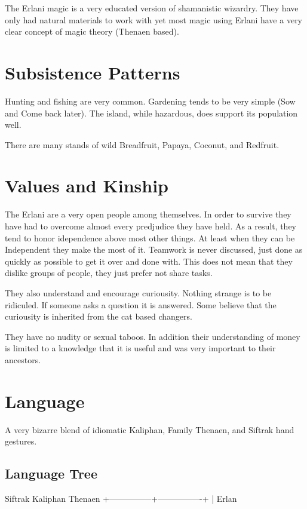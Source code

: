 The Erlani magic is a very educated version of shamanistic wizardry. They
have only had natural materials to work with yet most magic using Erlani
have a very clear concept of magic theory (Thenaen based).

\section{Subsistence Patterns}

Hunting and fishing are very common. Gardening tends to be very
simple (Sow and Come back later). The island, while hazardous, does
support its population well.

There are many stands of wild Breadfruit, Papaya, Coconut, and
Redfruit.

\section{Values and Kinship}

The Erlani are a very open people among themselves. In order to survive
they have had to overcome almost every predjudice they have held. As a
result, they tend to honor idependence above most other things. At
least when they can be Independent they make the most of it. Teamwork is
never discussed, just done as quickly as possible to get it over and
done with. This does not mean that they dislike groups of people, they
just prefer not share tasks.

They also understand and encourage curiousity. Nothing strange is to
be ridiculed. If someone asks a question it is answered. Some believe
that the curiousity is inherited from the cat based changers.

They have no nudity or sexual taboos. In addition their understanding
of money is limited to a knowledge that it is useful and was very
important to their ancestors.

\section{Language}

A very bizarre blend of idiomatic Kaliphan, Family Thenaen, and
Siftrak hand gestures.


\subsection{Language Tree}

Siftrak         Kaliphan          Thenaen
   +---------------+----------------+
                   |
                 Erlan

